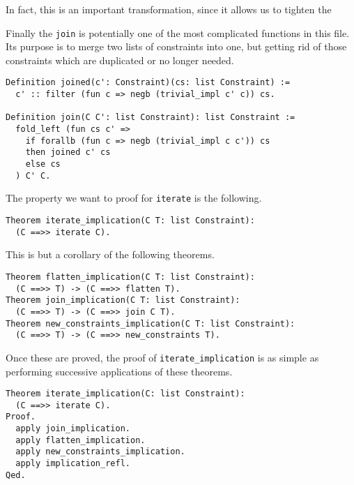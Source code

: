 In fact, this is an important transformation, since it allows us to tighten the 

Finally the \texttt{join} is potentially one of the most complicated functions in this file.
Its purpose is to merge two lists of constraints into one, but getting rid of those constraints which 
are duplicated or no longer needed.

\begin{verbatim}
Definition joined(c': Constraint)(cs: list Constraint) :=
  c' :: filter (fun c => negb (trivial_impl c' c)) cs.

Definition join(C C': list Constraint): list Constraint :=
  fold_left (fun cs c' => 
    if forallb (fun c => negb (trivial_impl c c')) cs
    then joined c' cs
    else cs
  ) C' C.
\end{verbatim}

The property we want to proof for \texttt{iterate} is the following.

\begin{verbatim}
Theorem iterate_implication(C T: list Constraint):
  (C ==>> iterate C).
\end{verbatim}

This is but a corollary of the following theorems.
\begin{verbatim}
Theorem flatten_implication(C T: list Constraint):
  (C ==>> T) -> (C ==>> flatten T).
Theorem join_implication(C T: list Constraint):
  (C ==>> T) -> (C ==>> join C T).
Theorem new_constraints_implication(C T: list Constraint):
  (C ==>> T) -> (C ==>> new_constraints T).
\end{verbatim}

Once these are proved, the proof of \texttt{iterate_implication} is as simple as performing
successive applications of these theorems.
\begin{verbatim}
Theorem iterate_implication(C: list Constraint):
  (C ==>> iterate C).
Proof.
  apply join_implication.
  apply flatten_implication.
  apply new_constraints_implication.
  apply implication_refl.
Qed.
\end{verbatim}
